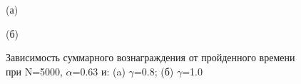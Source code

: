 \documentclass[a4paper]{report}
\theoremstyle{definition}
\theoremstyle{plain}
\theoremstyle{remark}
\theoremstyle{remark}
\theoremstyle{definition}
\begin{document}
\begin{figure}[H]
    \begin{minipage}[H]{0.49\linewidth}
        (а)\\
    \end{minipage}
    \hfill
    \begin{minipage}[H]{0.49\linewidth}
        (б)\\
    \end{minipage}
     \caption{Зависимость суммарного вознаграждения от пройденного времени при N=5000, $\alpha$=0.63 и: (a) $\gamma$=0.8; (б) $\gamma$=1.0}
\end{figure}
\end{document}
